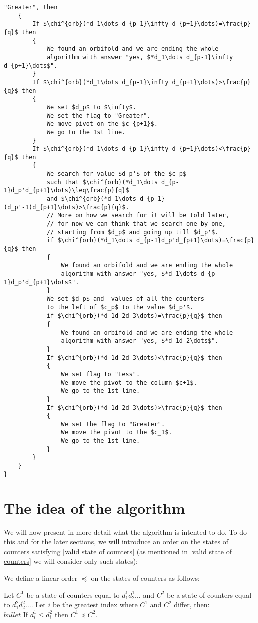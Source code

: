 \begin{lstlisting}[firstnumber=1,consecutivenumbers=true]
    "Greater", then
    {
        If $\chi^{orb}(*d_1\dots d_{p-1}\infty d_{p+1}\dots)=\frac{p}{q}$ then
        {
            We found an orbifold and we are ending the whole
            algorithm with answer "yes, $*d_1\dots d_{p-1}\infty d_{p+1}\dots$".
        } 
        If $\chi^{orb}(*d_1\dots d_{p-1}\infty d_{p+1}\dots)>\frac{p}{q}$ then
        {
            We set $d_p$ to $\infty$.
            We set the flag to "Greater".
            We move pivot on the $c_{p+1}$.
            We go to the 1st line.
        }  
        If $\chi^{orb}(*d_1\dots d_{p-1}\infty d_{p+1}\dots)<\frac{p}{q}$ then
        {
            We search for value $d_p'$ of the $c_p$ 
            such that $\chi^{orb}(*d_1\dots d_{p-1}d_p'd_{p+1}\dots)\leq\frac{p}{q}$ 
            and $\chi^{orb}(*d_1\dots d_{p-1}(d_p'-1)d_{p+1}\dots)>\frac{p}{q}$.
            // More on how we search for it will be told later, 
            // for now we can think that we search one by one,
            // starting from $d_p$ and going up till $d_p'$.
            if $\chi^{orb}(*d_1\dots d_{p-1}d_p'd_{p+1}\dots)=\frac{p}{q}$ then 
            {
                We found an orbifold and we are ending the whole
                algorithm with answer "yes, $*d_1\dots d_{p-1}d_p'd_{p+1}\dots$".
            }
            We set $d_p$ and  values of all the counters 
            to the left of $c_p$ to the value $d_p'$.
            if $\chi^{orb}(*d_1d_2d_3\dots)=\frac{p}{q}$ then 
            {
                We found an orbifold and we are ending the whole
                algorithm with answer "yes, $*d_1d_2\dots$".
            }
            If $\chi^{orb}(*d_1d_2d_3\dots)<\frac{p}{q}$ then 
            {
                We set flag to "Less".
                We move the pivot to the column $c+1$.
                We go to the 1st line.
            }
            If $\chi^{orb}(*d_1d_2d_3\dots)>\frac{p}{q}$ then 
            {
                We set the flag to "Greater".
                We move the pivot to the $c_1$.
                We go to the 1st line.
            }
        }  
    }
}
\end{lstlisting}
\section{The idea of the algorithm}
We will now present in more detail what the algorithm is intented to do. 
To do this and for the later sections, we will introduce an order on the states 
of counters satisfying \ref{valid state of counters} (as mentioned in 
\ref{valid state of counters} we will consider only such states): 
\begin{definition}
We define a linear order $\preceq$ on the states of counters as follows:

Let $C^1$ be a state of counters equal to $d_1^1d_2^1\dots$ and $C^2$ be a state of counters 
equal to $d_1^2d_2^2\dots$. Let $i$ be the greatest index where $C^1$ and $C^2$ differ, then:\\
$bullet$ If $d_i^1 \leq d_i^2$ then $C^1 \preceq C^2$. 
\end{definition}

